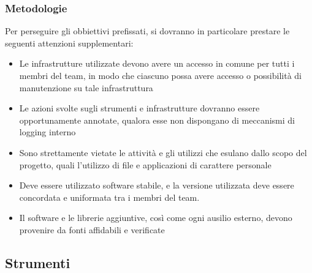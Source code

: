 	\subsubsection{Metodologie}
	Per perseguire gli obbiettivi prefissati, si dovranno in particolare prestare le seguenti attenzioni supplementari:
	
	\begin{itemize}
		\item Le infrastrutture utilizzate devono avere un accesso in comune per tutti i membri del team, in modo che ciascuno possa avere accesso o possibilità di manutenzione su tale infrastruttura
		\item Le azioni svolte sugli strumenti e infrastrutture dovranno essere opportunamente annotate, qualora esse non dispongano di meccanismi di logging interno
		\item Sono strettamente vietate le attività e gli utilizzi che esulano dallo scopo del progetto, quali l'utilizzo di file e applicazioni di carattere personale
		\item Deve essere utilizzato software stabile, e la versione utilizzata deve essere concordata e uniformata tra i membri del team.
		\item Il software e le librerie aggiuntive, così come ogni ausilio esterno, devono provenire da fonti affidabili e verificate
	\end{itemize}
	
	\newpage
	\subsection{Strumenti}

